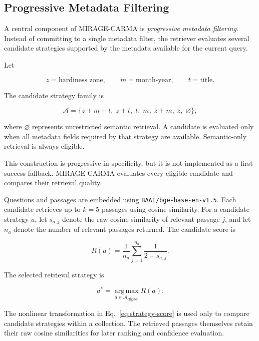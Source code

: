 \documentclass[runningheads]{llncs}
\begin{document}
\subsection{Progressive Metadata Filtering}

A central component of MIRAGE-CARMA is \emph{progressive metadata filtering}. Instead of committing to a single metadata filter, the retriever evaluates several candidate strategies supported by the metadata available for the current query.

Let

\[
z=\text{hardiness zone}, \qquad
m=\text{month-year}, \qquad
t=\text{title}.
\]

The candidate strategy family is

\begin{equation}
\mathcal{A}
=
\{
z+m+t,\;
z+t,\;
t,\;
m,\;
z+m,\;
z,\;
\varnothing
\},
\label{eq:candidates}
\end{equation}

where \(\varnothing\) represents unrestricted semantic retrieval. A candidate is evaluated only when all metadata fields required by that strategy are available. Semantic-only retrieval is always eligible.

This construction is progressive in specificity, but it is not implemented as a first-success fallback. MIRAGE-CARMA evaluates every eligible candidate and compares their retrieval quality.

Questions and passages are embedded using \texttt{BAAI/bge-base-en-v1.5}. Each candidate retrieves up to \(k=5\) passages using cosine similarity. For a candidate strategy \(a\), let \(s_{a,j}\) denote the raw cosine similarity of relevant passage \(j\), and let \(n_a\) denote the number of relevant passages returned. The candidate score is

\begin{equation}
R(a)
=
\frac{1}{n_a}
\sum_{j=1}^{n_a}
\frac{1}{2-s_{a,j}}.
\label{eq:strategy-score}
\end{equation}

The selected retrieval strategy is

\begin{equation}
a^*
=
\operatorname*{arg\,max}_{a\in\mathcal{A}_{\mathrm{eligible}}}
R(a).
\label{eq:strategy-select}
\end{equation}

The nonlinear transformation in Eq.~\ref{eq:strategy-score} is used only to compare candidate strategies within a collection. The retrieved passages themselves retain their raw cosine similarities for later ranking and confidence evaluation.
\end{document}
